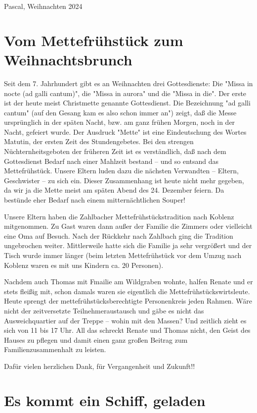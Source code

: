 \documentclass[11pt]{article}
\begin{document}
Pascal, Weihnachten 2024

\section*{Vom Mettefrühstück zum Weihnachtsbrunch}

Seit dem 7. Jahrhundert gibt es an Weihnachten drei Gottesdienste:
Die "Missa in nocte (ad galli cantum)", die "Missa in aurora" und die "Missa in die".
Der erste ist der heute meist Christmette genannte Gottesdienst.
Die Bezeichnung "ad galli cantum" (auf den Gesang kam es also schon immer an") zeigt,
daß die Messe ursprünglich in der späten Nacht, bzw. am ganz frühen Morgen, noch in der Nacht, gefeiert wurde.
Der Ausdruck "Mette" ist eine Eindeutschung des Wortes Matutin, der ersten Zeit des Stundengebetes.
Bei den strengen Nüchternheitsgeboten der früheren Zeit ist es verständlich,
daß nach dem Gottesdienst Bedarf nach einer Mahlzeit bestand -- und so entsand das Mettefrühstück.
Unsere Eltern luden dazu die nächsten Verwandten -- Eltern, Geschwister -- zu sich ein.
Dieser Zusammenhang ist heute nicht mehr gegeben, da wir ja die Mette meist am späten Abend des 24. Dezember feiern.
Da bestünde eher Bedarf nach einem mitternächtlichen Souper!

Unsere Eltern haben die Zahlbacher Mettefrühstückstradition nach Koblenz mitgenommen.
Zu Gast waren dann außer der Familie die Zimmers oder vielleicht eine Oma auf Besuch.
Nach der Rückkehr nach Zahlbach ging die Tradition ungebrochen weiter.
Mittlerweile hatte sich die Familie ja sehr vergrößert und der Tisch wurde immer länger
(beim letzten Mettefrühstück vor dem Umzug nach Koblenz waren es mit uns Kindern ca. 20 Personen).

Nachdem auch Thomas mit Fmailie am Wildgraben wohnte, halfen Renate und er stets fleißig mit,
schon damals waren sie eigentlich die Mettefrühstückswirtsleute.
Heute sprengt der mettefrühstücksberechtigte Personenkreis jeden Rahmen.
Wäre nicht der zeitversetzte Teilnehmeraustausch und gäbe es nicht das Ausweichquartier auf der Treppe -- wohin mit den Massen?
Und zeitlich zieht es sich von 11 bis 17 Uhr.
All das schreckt Renate und Thomas nicht, den Geist des Hauses zu pflegen
und damit einen ganz großen Beitrag zum Familienzusammenhalt zu leisten.

Dafür vielen herzlichen Dank, für Vergangenheit und Zukunft!!


\section{Es kommt ein Schiff, geladen}
\end{document}
